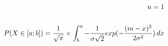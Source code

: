 \documentclass[preview]{standalone}
\begin{document}
\begin{align*}
u = 1 \\ \\ P( X \in [a;b] ) = { \frac{1}{\sqrt{\pi}} } \times \int_b^a { { - \frac{1}{\sigma \sqrt{2}} } exp(-{ {(m - x)^2} \over {2 \sigma^2} }) } \, dx
\end{align*}
\end{document}
